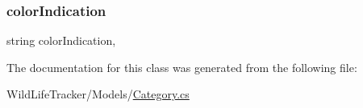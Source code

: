 \subsubsection{\texorpdfstring{color\+Indication}{colorIndication}}
{\footnotesize\ttfamily string color\+Indication\hspace{0.3cm}{\ttfamily [get]}, {\ttfamily [set]}}



The documentation for this class was generated from the following file\+:\begin{DoxyCompactItemize}
\item 
Wild\+Life\+Tracker/\+Models/\hyperlink{Category_8cs}{Category.\+cs}\end{DoxyCompactItemize}
